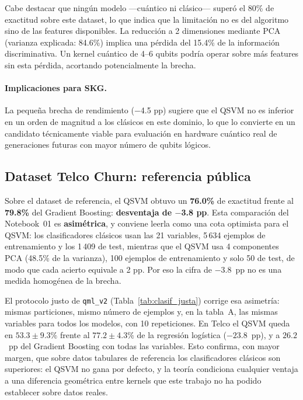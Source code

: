 Cabe destacar que ningún modelo ---cuántico ni clásico--- superó el 80\% de exactitud sobre este dataset, lo que indica que la limitación no es del algoritmo sino de las features disponibles. La reducción a 2 dimensiones mediante PCA (varianza explicada: 84.6\%) implica una pérdida del 15.4\% de la información discriminativa. Un kernel cuántico de 4--6 qubits podría operar sobre más features sin esta pérdida, acortando potencialmente la brecha.

\paragraph{Implicaciones para SKG.}
La pequeña brecha de rendimiento ($-$4.5 pp) sugiere que el QSVM no es inferior en un orden de magnitud a los clásicos en este dominio, lo que lo convierte en un candidato técnicamente viable para evaluación en hardware cuántico real de generaciones futuras con mayor número de qubits lógicos.

\subsection{Dataset Telco Churn: referencia pública}

Sobre el dataset de referencia, el QSVM obtuvo un \textbf{76.0\%} de exactitud frente al \textbf{79.8\%} del Gradient Boosting: \textbf{desventaja de $-$3.8 pp}. Esta comparación del Notebook~01 es \textbf{asimétrica}, y conviene leerla como una cota optimista para el QSVM: los clasificadores clásicos usan las 21 variables, 5\,634 ejemplos de entrenamiento y los 1\,409 de test, mientras que el QSVM usa 4 componentes PCA (48.5\% de la varianza), 100 ejemplos de entrenamiento y solo 50 de test, de modo que cada acierto equivale a 2 pp. Por eso la cifra de $-3.8$~pp no es una medida homogénea de la brecha.

El protocolo justo de \texttt{qml\_v2} (Tabla~\ref{tab:clasif_justa}) corrige esa asimetría: mismas particiones, mismo número de ejemplos y, en la tabla~A, las mismas variables para todos los modelos, con 10 repeticiones. En Telco el QSVM queda en $53.3\pm9.3\%$ frente al $77.2\pm4.3\%$ de la regresión logística ($-23.8$~pp), y a $26.2$~pp del Gradient Boosting con todas las variables. Esto confirma, con mayor margen, que sobre datos tabulares de referencia los clasificadores clásicos son superiores: el QSVM no gana por defecto, y la teoría \citep{huang2021} condiciona cualquier ventaja a una diferencia geométrica entre kernels que este trabajo no ha podido establecer sobre datos reales.

